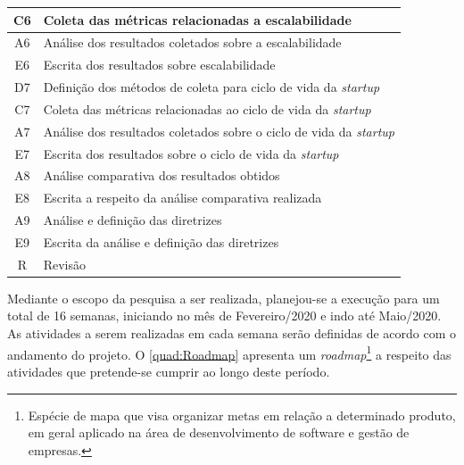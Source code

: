 \begin{quadro}
\begin{tabular}{ | c | m{12cm} | }
        C6 & Coleta das métricas relacionadas a escalabilidade \\ \hline
        A6 & Análise dos resultados coletados sobre a escalabilidade \\ \hline
        E6 & Escrita dos resultados sobre escalabilidade \\ \hline
        D7 & Definição dos métodos de coleta para ciclo de vida da \textit{startup} \\ \hline
        C7 & Coleta das métricas relacionadas ao ciclo de vida da \textit{startup} \\ \hline
        A7 & Análise dos resultados coletados sobre o ciclo de vida da \textit{startup} \\ \hline
        E7 & Escrita dos resultados sobre o ciclo de vida da \textit{startup} \\ \hline
        A8 & Análise comparativa dos resultados obtidos \\ \hline
        E8 & Escrita a respeito da análise comparativa realizada \\ \hline
        A9 & Análise e definição das diretrizes \\ \hline
        E9 & Escrita da análise e definição das diretrizes \\ \hline
        R  & Revisão
    \end{tabular}
\end{quadro}

Mediante o escopo da pesquisa a ser realizada, planejou-se a execução para um total
de 16 semanas, iniciando no mês de Fevereiro/2020 e indo até Maio/2020. As atividades
a serem realizadas em cada semana serão definidas de acordo com o andamento do projeto.
O \autoref{quad:Roadmap} apresenta um \textit{roadmap}\footnote{Espécie de mapa que
visa organizar metas em relação a determinado produto, em geral aplicado na área de
desenvolvimento de software e gestão de empresas.} a respeito das atividades que
pretende-se cumprir ao longo deste período.

